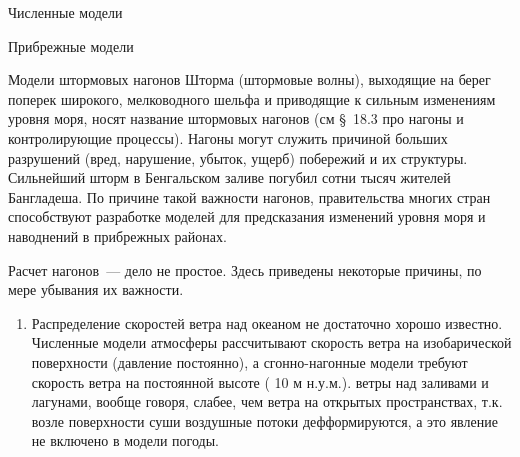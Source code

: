 \begin{chapter}{Численные модели}
\begin{section}{Прибрежные модели}
\begin{paragraph}{Модели штормовых нагонов}
Шторма (штормовые волны), выходящие на берег поперек широкого,
мелководного шельфа и приводящие к сильным изменениям уровня моря,
носят название штормовых нагонов (см \S~18.3 про нагоны и
контролирующие процессы). Нагоны могут служить причиной больших
разрушений (вред, нарушение, убыток, ущерб) побережий и их
структуры. Сильнейший шторм в Бенгальском заливе погубил сотни тысяч
жителей Бангладеша. По причине такой важности нагонов, правительства
многих стран способствуют разработке моделей для предсказания
изменений уровня моря и наводнений в прибрежных районах.
%

Расчет нагонов~--- дело не простое. Здесь приведены некоторые причины,
по мере убывания их важности.
%
\begin{enumerate}
\item
Распределение скоростей ветра над океаном не достаточно хорошо
известно. Численные модели атмосферы рассчитывают скорость ветра на
изобарической поверхности (давление постоянно), а сгонно-нагонные
модели требуют скорость ветра на постоянной высоте ( 10 м
н.у.м.). ветры над заливами и лагунами, вообще говоря, слабее, чем
ветра на открытых пространствах, т.к. возле поверхности суши воздушные
потоки дефформируются, а это явление не включено в модели погоды.
%


\end{enumerate}
\end{paragraph}
\end{section}
\end{chapter}
